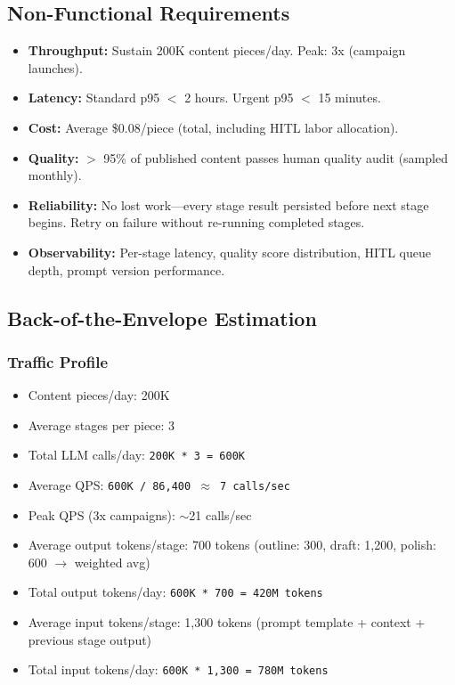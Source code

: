\subsection*{Non-Functional Requirements}

\begin{itemize}
  \item \textbf{Throughput:} Sustain 200K content pieces/day. Peak: 3x (campaign launches).
  \item \textbf{Latency:} Standard p95 $<$ 2 hours. Urgent p95 $<$ 15 minutes.
  \item \textbf{Cost:} Average \$0.08/piece (total, including HITL labor allocation).
  \item \textbf{Quality:} $>$ 95\% of published content passes human quality audit (sampled monthly).
  \item \textbf{Reliability:} No lost work---every stage result persisted before next stage begins. Retry on failure without re-running completed stages.
  \item \textbf{Observability:} Per-stage latency, quality score distribution, HITL queue depth, prompt version performance.
\end{itemize}

\subsection*{Back-of-the-Envelope Estimation}

\subsubsection*{Traffic Profile}

\begin{itemize}
  \item Content pieces/day: 200K
  \item Average stages per piece: 3
  \item Total LLM calls/day: \texttt{200K * 3 = 600K}
  \item Average QPS: \texttt{600K / 86,400 $\approx$ 7 calls/sec}
  \item Peak QPS (3x campaigns): $\sim$21 calls/sec
  \item Average output tokens/stage: 700 tokens (outline: 300, draft: 1,200, polish: 600 $\rightarrow$ weighted avg)
  \item Total output tokens/day: \texttt{600K * 700 = 420M tokens}
  \item Average input tokens/stage: 1,300 tokens (prompt template + context + previous stage output)
  \item Total input tokens/day: \texttt{600K * 1,300 = 780M tokens}
\end{itemize}

